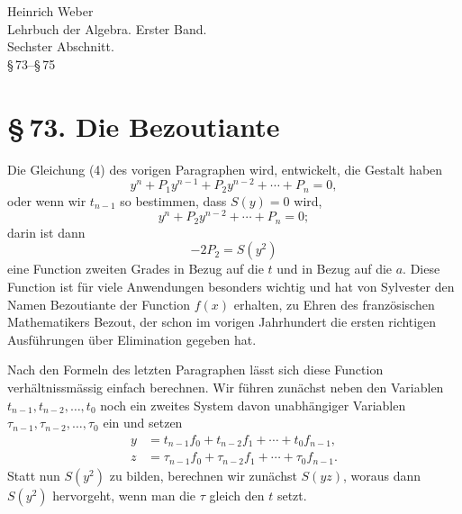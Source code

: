 \documentclass[11pt]{article}
\newcommand{\sect}[2]{\section*{\S\,#1. #2}}
\begin{document}
\begin{center}
{\large Heinrich Weber}\\[0.35em]
{\Large Lehrbuch der Algebra. Erster Band.}\\[0.35em]
{\large Sechster Abschnitt.}\\[0.25em]
{\large \S\,73--\S\,75}
\end{center}

\sect{73}{Die Bezoutiante}

Die Gleichung (4) des vorigen Paragraphen wird, entwickelt, die Gestalt haben
\[
 y^n+P_1y^{n-1}+P_2y^{n-2}+\cdots+P_n=0,
\]
oder wenn wir $t_{n-1}$ so bestimmen, dass $S(y)=0$ wird,
\begin{equation}
 y^n+P_2y^{n-2}+\cdots+P_n=0;
\tag{1}
\end{equation}
darin ist dann
\[
 -2P_2=S(y^2)
\]
eine Function zweiten Grades in Bezug auf die $t$ und in Bezug auf die $a$. Diese Function ist für viele Anwendungen besonders wichtig und hat von Sylvester den Namen Bezoutiante der Function $f(x)$ erhalten, zu Ehren des französischen Mathematikers Bezout, der schon im vorigen Jahrhundert die ersten richtigen Ausführungen über Elimination gegeben hat.

Nach den Formeln des letzten Paragraphen lässt sich diese Function verhältnissmässig einfach berechnen. Wir führen zunächst neben den Variablen $t_{n-1},t_{n-2},\ldots,t_0$ noch ein zweites System davon unabhängiger Variablen $\tau_{n-1},\tau_{n-2},\ldots,\tau_0$ ein und setzen
\begin{equation}
\begin{aligned}
 y&=t_{n-1}f_0+t_{n-2}f_1+\cdots+t_0f_{n-1},\\
 z&=\tau_{n-1}f_0+\tau_{n-2}f_1+\cdots+\tau_0f_{n-1}.
\end{aligned}
\tag{2}
\end{equation}
Statt nun $S(y^2)$ zu bilden, berechnen wir zunächst $S(yz)$, woraus dann $S(y^2)$ hervorgeht, wenn man die $\tau$ gleich den $t$ setzt.
\end{document}
